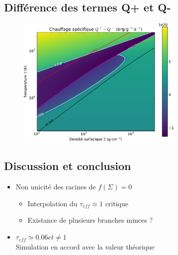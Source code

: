 \documentclass[french]{beamer}
\begin{document}

\begin{frame}
\section{Différence des termes Q+ et Q-}

   \begin{figure}[htb!]
      \includegraphics[width=8cm]{figures/Qmap.pdf}
   \end{figure}
\end{frame}


\begin{frame}
\section{Discussion et conclusion}

   \begin{itemize}
      \item Non unicité des racines de $f(\Sigma) = 0$
      \\
         \begin{itemize}
            \item Interpolation du $\tau_{eff} \approx 1$ critique
            \item Existance de plusieurs branches minces ? 
         \end{itemize}  
      \item $\tau_{eff} \simeq 0.06 et \neq 1$ 
      \\
Simulation en accord avec la valeur théorique
   \end{itemize}
\end{frame}
\end{document}
